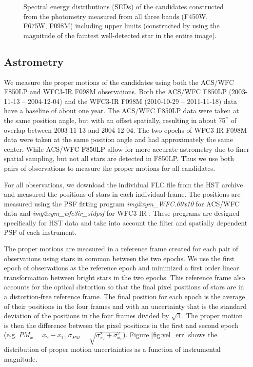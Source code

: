 \documentclass{aa}
\begin{document}
\begin{figure}[h!]
 \centering
    \caption{Spectral energy distributions (SEDs) of the candidates constructed from the photometry measured from all three bands (F450W, F675W, F098M) including upper limits (constructed by using the magnitude of the faintest well-detected star in the entire image).}
       \label{fig:pure_seds}
\end{figure}



\subsection{Astrometry}

We measure the proper motions of the candidates using both the ACS/WFC F850LP and WFC3-IR F098M observations. Both the ACS/WFC F850LP (2003-11-13 -- 2004-12-04) and the WFC3-IR F098M (2010-10-29 -- 2011-11-18) data have a baseline of about one year. The ACS/WFC F850LP data were taken at the same position angle, but with an offset spatially, resulting in about 75$^{\prime\prime}$ of overlap between 2003-11-13 and 2004-12-04. The two epochs of WFC3-IR F098M data were taken at the same position angle and had approximately the same center. While ACS/WFC F850LP allow for more accurate astrometry due to finer spatial sampling, but not all stars are detected in F850LP. Thus we use both pairs of observations to measure the proper motions for all candidates.

For all observations, we download the individual FLC file from the HST archive and measured the positions of stars in each individual frame. The positions are measured using the PSF fitting program \textit{img2xym\_WFC.09x10} for ACS/WFC data and \textit{img2xym\_wfc3ir\_stdpsf} for WFC3-IR \citep[e.g.][]{
2000PASP..112.1360A, 2015ApJ...813...27H, 2017ApJ...844..167B}. These programs are designed specifically for HST data and take into account the filter and spatially dependent PSF of each instrument.

The proper motions are measured in a reference frame created for each pair of observations using stars in common between the two epochs. We use the first epoch of observations as the reference epoch and minimized a first order linear transformation between bright stars in the two epochs. This reference frame also accounts for the optical distortion so that the final pixel positions of stars are in a distortion-free reference frame. The final position for each epoch is the average of their positions in the four frames and with an uncertainty that is the standard deviation of the positions in the four frames divided by $\sqrt{4}$. The proper motion is then the difference between the pixel positions in the first and second epoch (e.g. $PM_{x} = x_2 - x_1$, $\sigma_{PM} = \sqrt{\sigma_{x_2}^2 + \sigma_{x_1}^2}$). Figure \ref{fig:vel_err} shows the distribution of proper motion uncertainties as a function of instrumental magnitude.
\end{document}
